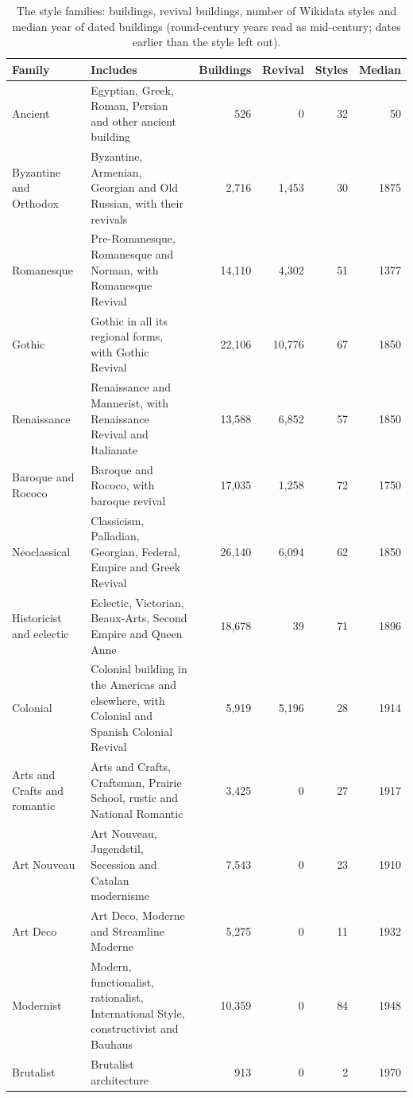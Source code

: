 \documentclass[11pt,a4paper]{article}
\begin{document}
\begin{table}[tbp]\centering\footnotesize\caption{The style families: buildings, revival buildings, number of Wikidata styles and median year of dated buildings (round-century years read as mid-century; dates earlier than the style left out).}\label{tab:fam}\setlength{\tabcolsep}{4pt}\begin{tabular}{>{\raggedright\arraybackslash}p{3.2cm}>{\raggedright\arraybackslash}p{6.4cm}rrrr}\toprule Family & Includes & Buildings & Revival & Styles & Median\\\midrule
Ancient & Egyptian, Greek, Roman, Persian and other ancient building & 526 & 0 & 32 & 50\\
Byzantine and Orthodox & Byzantine, Armenian, Georgian and Old Russian, with their revivals & 2,716 & 1,453 & 30 & 1875\\
Romanesque & Pre-Romanesque, Romanesque and Norman, with Romanesque Revival & 14,110 & 4,302 & 51 & 1377\\
Gothic & Gothic in all its regional forms, with Gothic Revival & 22,106 & 10,776 & 67 & 1850\\
Renaissance & Renaissance and Mannerist, with Renaissance Revival and Italianate & 13,588 & 6,852 & 57 & 1850\\
Baroque and Rococo & Baroque and Rococo, with baroque revival & 17,035 & 1,258 & 72 & 1750\\
Neoclassical & Classicism, Palladian, Georgian, Federal, Empire and Greek Revival & 26,140 & 6,094 & 62 & 1850\\
Historicist and eclectic & Eclectic, Victorian, Beaux-Arts, Second Empire and Queen Anne & 18,678 & 39 & 71 & 1896\\
Colonial & Colonial building in the Americas and elsewhere, with Colonial and Spanish Colonial Revival & 5,919 & 5,196 & 28 & 1914\\
Arts and Crafts and romantic & Arts and Crafts, Craftsman, Prairie School, rustic and National Romantic & 3,425 & 0 & 27 & 1917\\
Art Nouveau & Art Nouveau, Jugendstil, Secession and Catalan modernisme & 7,543 & 0 & 23 & 1910\\
Art Deco & Art Deco, Moderne and Streamline Moderne & 5,275 & 0 & 11 & 1932\\
Modernist & Modern, functionalist, rationalist, International Style, constructivist and Bauhaus & 10,359 & 0 & 84 & 1948\\
Brutalist & Brutalist architecture & 913 & 0 & 2 & 1970\\

\end{tabular}
\end{table}
\end{document}
